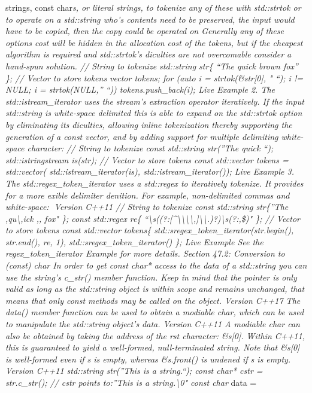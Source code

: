 strings, const char\emph{s, or literal strings, to tokenize any of these
with std::strtok or to operate on a std::string who's contents need to
be preserved, the input would have to be copied, then the copy could be
operated on Generally any of these options cost will be hidden in the
allocation cost of the tokens, but if the cheapest algorithm is required
and std::strtok's diculties are not overcomable consider a hand-spun
solution. // String to tokenize std::string str\{ ``The quick brown
fox'' \}; // Vector to store tokens vector tokens; for (auto i =
strtok(\&str{[}0{]}, " ``); i != NULL; i = strtok(NULL,'' ``))
tokens.push\_back(i); Live Example 2. The std::istream\_iterator uses
the stream's extraction operator iteratively. If the input std::string
is white-space delimited this is able to expand on the std::strtok
option by eliminating its diculties, allowing inline tokenization
thereby supporting the generation of a const vector, and by adding
support for multiple delimiting white-space character: // String to
tokenize const std::string str(''The quick \tbrown \nfox``);
std::istringstream is(str); // Vector to store tokens const std::vector
tokens = std::vector( std::istream\_iterator(is),
std::istream\_iterator()); Live Example 3. The
std::regex\_token\_iterator uses a std::regex to iteratively tokenize.
It provides for a more exible delimiter denition. For example,
non-delimited commas and white-space: Version C++11 // String to
tokenize const std::string str\{''The ,qu\textbackslash,ick ,\tbrown,
fox" \}; const std::regex re\{
``\textbackslash s\emph{((?:{[}\^{}\textbackslash\textbackslash\textbackslash\textbackslash,{]}\textbar\textbackslash\textbackslash.)}?)\textbackslash s\emph{(?:,\textbar\$)"
\}; // Vector to store tokens const std::vector tokens\{
std::sregex\_token\_iterator(str.begin(), str.end(), re, 1),
std::sregex\_token\_iterator() \}; Live Example See the
regex\_token\_iterator Example for more details. Section 47.2:
Conversion to (const) char} In order to get const char* access to the
data of a std::string you can use the string's c\_str() member function.
Keep in mind that the pointer is only valid as long as the std::string
object is within scope and remains unchanged, that means that only const
methods may be called on the object. Version C++17 The data() member
function can be used to obtain a modiable char\emph{, which can be used
to manipulate the std::string object's data. Version C++11 A modiable
char} can also be obtained by taking the address of the rst character:
\&s{[}0{]}. Within C++11, this is guaranteed to yield a well-formed,
null-terminated string. Note that \&s{[}0{]} is well-formed even if s is
empty, whereas \&s.front() is undened if s is empty. Version C++11
std::string str(''This is a string.``); const char* cstr = str.c\_str();
// cstr points to:''This is a string.\textbackslash0" const char} data =
